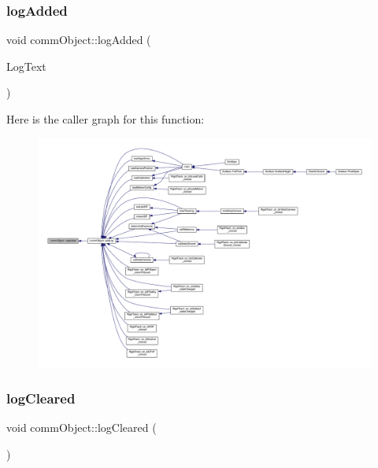 \subsubsection{\texorpdfstring{log\+Added}{logAdded}}
{\footnotesize\ttfamily void comm\+Object\+::log\+Added (\begin{DoxyParamCaption}\item[{Q\+String}]{Log\+Text }\end{DoxyParamCaption})\hspace{0.3cm}{\ttfamily [signal]}}

Here is the caller graph for this function\+:
\nopagebreak
\begin{figure}[H]
\begin{center}
\leavevmode
\includegraphics[width=350pt]{classcomm_object_a72620fe1bac16309baf6d148644edaf9_icgraph}
\end{center}
\end{figure}
\mbox{\label{classcomm_object_af2304085624c26230e9d930d616e3e19}} 
\subsubsection{\texorpdfstring{log\+Cleared}{logCleared}}
{\footnotesize\ttfamily void comm\+Object\+::log\+Cleared (\begin{DoxyParamCaption}{ }\end{DoxyParamCaption})\hspace{0.3cm}{\ttfamily [signal]}}

